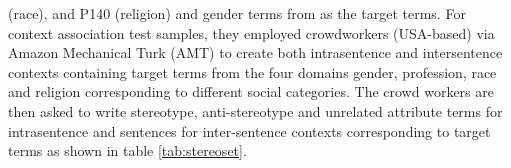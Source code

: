 (race), and P140 (religion) and gender terms from \cite{nosek2002math} as the target terms. For context association test samples, they employed crowdworkers (USA-based) via Amazon Mechanical Turk (AMT) to create both intrasentence and intersentence contexts containing target terms from the four domains gender, profession, race and religion corresponding to different social categories. The crowd workers are then asked to write stereotype, anti-stereotype and unrelated attribute terms for intrasentence and sentences for inter-sentence contexts corresponding to target terms as shown in table \ref{tab:stereoset}.  
\begin{table}[t!]
\caption{Stereoset Intersentence and intrasentence samples }
\label{tab:stereoset}
\end{table}

